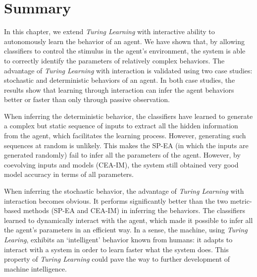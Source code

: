 \section{Summary}\label{sec:summary_interaction}


In this chapter, we extend \textit{Turing Learning} with interactive ability to autonomously learn the behavior of an agent. We have shown that, by allowing classifiers to control the stimulus in the agent's environment, the system is able to correctly identify the parameters of relatively complex behaviors. The advantage of \textit{Turing Learning} with interaction is validated using two case studies: stochastic and deterministic behaviors of an agent. In both case studies, the results show that learning through interaction can infer the agent behaviors better or faster than only through passive observation. 

When inferring the deterministic behavior, the classifiers have learned to generate a complex but static sequence of inputs to extract all the hidden information from the agent, which facilitates the learning process. However, generating such sequences at random is unlikely. This makes the SP-EA (in which the inputs are generated randomly) fail to infer all the parameters of the agent. However, by coevolving inputs and models (CEA-IM), the system still obtained very good model accuracy in terms of all parameters. 

When inferring the stochastic behavior, the advantage of \textit{Turing Learning} with interaction becomes obvious. 
It performs significantly better than the two metric-based methods (SP-EA and CEA-IM) in inferring the behaviors. The classifiers learned to dynamically interact with the agent, which made it possible to infer all the agent's parameters in an efficient way. In a sense, the machine, using \textit{Turing Learing}, exhibits an `intelligent' behavior known from humans: it adapts to interact with a system in order to learn faster what the system does. This property of \textit{Turing Learning} could pave the way to further development of machine intelligence. 

